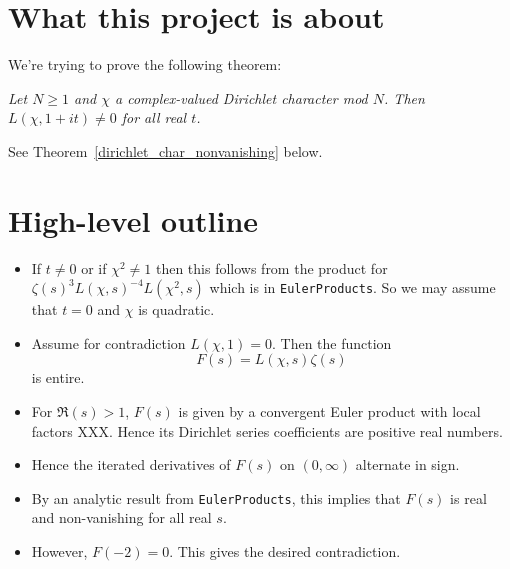 %

\setcounter{section}{0}

\section{What this project is about}

We're trying to prove the following theorem:

\emph{Let $N \ge 1$ and $\chi$ a complex-valued Dirichlet character mod $N$. Then $L(\chi, 1 + it) \ne 0$ for all real $t$.}

See Theorem~\ref{dirichlet_char_nonvanishing} below.

\section{High-level outline}

\begin{itemize}

\item If $t \ne 0$ or if $\chi^2 \ne 1$ then this follows from the product for $\zeta(s)^3 L(\chi, s)^{-4} L(\chi^2, s)$ which is in \texttt{EulerProducts}. So we may assume that $t = 0$ and $\chi$ is quadratic.

\item Assume for contradiction $L(\chi, 1) = 0$. Then the function
\[ F(s) = L(\chi, s) \zeta(s) \]
is entire.

\item For $\Re(s) > 1$, $F(s)$ is given by a convergent Euler product with local factors XXX. Hence its Dirichlet series coefficients are positive real numbers.

\item Hence the iterated derivatives of $F(s)$ on $(0, \infty)$ alternate in sign.

\item By an analytic result from \texttt{EulerProducts}, this implies that $F(s)$ is real and non-vanishing for all real $s$.

\item However, $F(-2) = 0$. This gives the desired contradiction.

\end{itemize}

